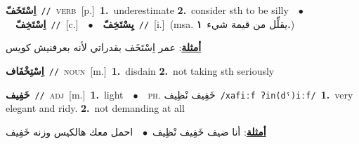\documentclass[10pt,a4paper,twoside]{article} %
\begin{document}
\begin{multicols}{2}
{\setlength\topsep{0pt}\textbf{\foreignlanguage{arabic}{اِسْتَخَفّ}}\ {\color{gray}\texttt{//}\color{black}}\ \textsc{verb}\ [p.]\ \textbf{1.}~underestimate  \textbf{2.}~consider sth to be silly\ \ $\bullet$\ \ \setlength\topsep{0pt}\textbf{\foreignlanguage{arabic}{اِسْتَخِفّ}}\ {\color{gray}\texttt{//}\color{black}}\ [c.]\ \ $\bullet$\ \ \setlength\topsep{0pt}\textbf{\foreignlanguage{arabic}{يِسْتَخِفّ}}\ {\color{gray}\texttt{//}\color{black}}\ [i.]\ \color{gray}(msa. \foreignlanguage{arabic}{يقلِّل من قيمة شيء}~\foreignlanguage{arabic}{\textbf{١.}})\color{black}\  \begin{flushright}\color{gray}\foreignlanguage{arabic}{\textbf{\underline{\foreignlanguage{arabic}{أمثلة}}}: عمر اِسْتَخَف بقدراتي لأنه بعرفنيش كويس}\end{flushright}\color{black}} \vspace{2mm}

{\setlength\topsep{0pt}\textbf{\foreignlanguage{arabic}{اِسْتِخْفَاف}}\ {\color{gray}\texttt{//}\color{black}}\ \textsc{noun}\ [m.]\ \textbf{1.}~disdain  \textbf{2.}~not taking sth seriously\ } \vspace{2mm}

{\setlength\topsep{0pt}\textbf{\foreignlanguage{arabic}{خَفِيف}}\ {\color{gray}\texttt{//}\color{black}}\ \textsc{adj}\ [m.]\ \textbf{1.}~light\ \ $\bullet$\ \ \textsc{ph.} \color{gray} \foreignlanguage{arabic}{خَفِيف نْظِيف}\color{black}\ {\color{gray}\texttt{/{\sffamily xafiːf ʔin(dˤ)iːf}/}\color{black}}\ \textbf{1.}~very elegant and ridy.  \textbf{2.}~not demanding at all\  \begin{flushright}\color{gray}\foreignlanguage{arabic}{\textbf{\underline{\foreignlanguage{arabic}{أمثلة}}}: أنا ضيف خَفِيف نْظِيف\ $\bullet$\ \  احمل معك هالكيس وزنه خَفِيف}\end{flushright}\color{black}} \vspace{2mm}


\end{multicols}
\end{document}
